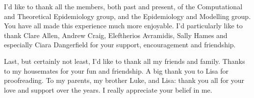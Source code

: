 I'd like to thank all the members, both past and present, of the Computational and Theoretical Epidemiology group, and the Epidemiology and Modelling group. You have all made this experience much more enjoyable. I'd particularly like to thank Clare Allen, Andrew Craig, Eleftherios Avramidis, Sally Hames and especially Ciara Dangerfield for your support, encouragement and friendship.

Last, but certainly not least, I'd like to thank all my friends and family. Thanks to my housemates for your fun and friendship. A big thank you to Lisa for proofreading. To my parents, my brother Luke, and Lisa: thank you all for your love and support over the years. I really appreciate your belief in me.

